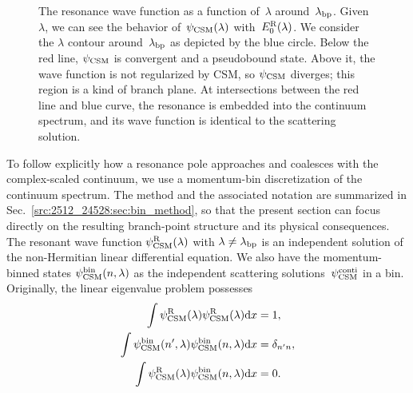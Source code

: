 \begin{figure}[t]
    \centering
{}
    \caption{The resonance wave function as a function of~$\lambda$ around~$\lambda_{\mathrm{bp}}$. Given $\lambda$, we can see the behavior of~$\psi_{\mathrm{CSM}}(\lambda)$ with~$E_0^{\mathrm{R}}(\lambda)$. We consider the $\lambda$ contour around~$\lambda_{\mathrm{bp}}$ as depicted by the blue circle. Below the red line, $\psi_{\mathrm{CSM}}$ is convergent and a pseudobound state. Above it, the wave function is not regularized by CSM, so $\psi_{\mathrm{CSM}}$ diverges; this region is a kind of branch plane. At intersections between the red line and blue curve, the resonance is embedded into the continuum spectrum, and its wave function is identical to the scattering solution.}
    \label{src:2512_24528:fig:lambda_contour}
\end{figure}
To follow explicitly how a resonance pole approaches and coalesces with the complex-scaled continuum, we use a momentum-bin discretization of the continuum spectrum. The method and the associated notation are summarized in Sec.~\ref{src:2512_24528:sec:bin_method}, so that the present section can focus directly on the resulting branch-point structure and its physical consequences.
The resonant wave function $\psi^{\mathrm{R}}_{\mathrm{CSM}}(\lambda)$ with $\lambda\neq\lambda_{\mathrm{bp}}$ is an independent solution of the non-Hermitian linear differential equation.
We also have the momentum-binned states $\psi^{\mathrm{bin}}_{\mathrm{CSM}}(n,\lambda)$ as the independent scattering solutions~$\psi^{\mathrm{conti}}_{\mathrm{CSM}}$ in a bin.
Originally, the linear eigenvalue problem possesses
\begin{align}
    \int \psi^{\mathrm{R}}_{\mathrm{CSM}}(\lambda) \psi^{\mathrm{R}}_{\mathrm{CSM}}(\lambda) \mathrm{d} x &= 1 , \\
    \int \psi^{\mathrm{bin}}_{\mathrm{CSM}}(n',\lambda) \psi^{\mathrm{bin}}_{\mathrm{CSM}}(n,\lambda) \mathrm{d} x &= \delta_{n'n}, \\
    \int \psi^{\mathrm{R}}_{\mathrm{CSM}}(\lambda) \psi^{\mathrm{bin}}_{\mathrm{CSM}}(n,\lambda) \mathrm{d} x &= 0 .
\end{align}
